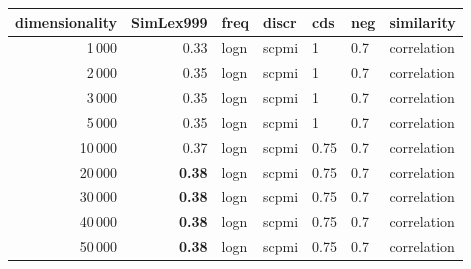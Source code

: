 \begin{tabular}{rrlllll}
\toprule
 dimensionality &  SimLex999 &  freq &  discr &   cds &  neg &   similarity \\
\midrule
           1\,000 &       0.33 &  logn &  scpmi &     1 &  0.7 &  correlation \\
           2\,000 &       0.35 &  logn &  scpmi &     1 &  0.7 &  correlation \\
           3\,000 &       0.35 &  logn &  scpmi &     1 &  0.7 &  correlation \\
           5\,000 &       0.35 &  logn &  scpmi &     1 &  0.7 &  correlation \\
          10\,000 &       0.37 &  logn &  scpmi &  0.75 &  0.7 &  correlation \\
          20\,000 &       \textbf{0.38} &  logn &  scpmi &  0.75 &  0.7 &  correlation \\
          30\,000 &       \textbf{0.38} &  logn &  scpmi &  0.75 &  0.7 &  correlation \\
          40\,000 &       \textbf{0.38} &  logn &  scpmi &  0.75 &  0.7 &  correlation \\
          50\,000 &       \textbf{0.38} &  logn &  scpmi &  0.75 &  0.7 &  correlation \\
\bottomrule
\end{tabular}
